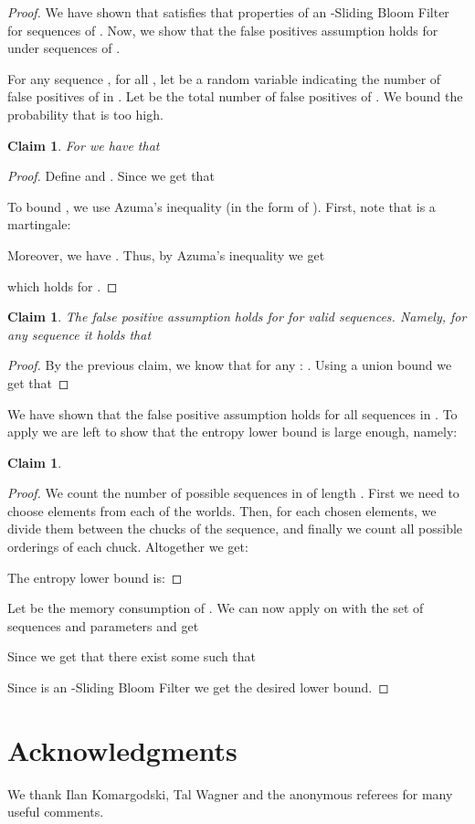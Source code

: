 \documentclass[11pt]{article}
\newtheorem{claim}[theorem]{Claim}
\begin{document}
\begin{proof}
We have shown that  satisfies that properties of an -Sliding Bloom Filter for sequences of . Now, we show that the false positives assumption holds for  under sequences of .

For any sequence , for all , let  be a random variable indicating the number of false positives of  in . Let  be the total number of false positives of . We bound the probability that  is too high.
\begin{claim}
For  we have that 
\end{claim}
\begin{proof}
Define  and . Since  we get that

To bound , we use Azuma's inequality (in the form of \cite[Theorem 7.2.1]{AlonS04}). First, note that  is a martingale:

Moreover, we have . Thus, by Azuma's inequality we get



which holds for .
\end{proof}

\begin{claim}
The false positive assumption holds for  for valid sequences. Namely, for any sequence  it holds that

\end{claim}
\begin{proof}
By the previous claim, we know that for any : . Using a union bound we get that

\end{proof}

We have shown that the false positive assumption holds for all sequences in . To apply  we are left to show that the entropy lower bound is large enough, namely:
\begin{claim}

\end{claim}
\begin{proof}
We count the number of possible sequences in  of length . First we need to choose  elements from each of the  worlds. Then, for each  chosen elements, we divide them between the  chucks of the sequence, and finally we count all possible orderings of each chuck. Altogether we get:


The entropy lower bound is:


\end{proof}

Let  be the memory consumption of . We can now apply  on  with the set of sequences  and parameters  and get

Since  we get that there exist some  such that


Since  is an -Sliding Bloom Filter we get the desired lower bound.
\end{proof}

\section{Acknowledgments}
We thank Ilan Komargodski, Tal Wagner and the anonymous referees for many useful comments.



\end{document}
